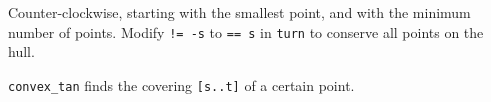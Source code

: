 Counter-clockwise, starting with the smallest point, and with the minimum number of points. Modify \texttt{!= -s} to \texttt{== s} in \texttt{turn} to conserve all points on the hull.

\texttt{convex\_tan} finds the covering \texttt{[s..t]} of a certain point. 



